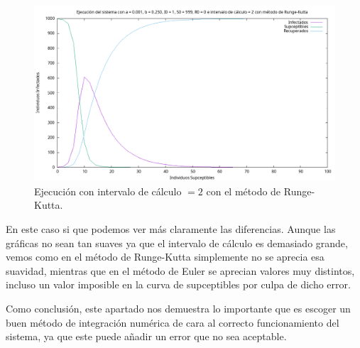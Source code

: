 \documentclass[12pt, spanish]{article}
\begin{document}
\begin{figure}[H]
	\centering
			\includegraphics[width=\textwidth]{SIR_2_runge.png}
			\caption{Ejecución con intervalo de cálculo $= 2$ con el método de Runge-Kutta.}
\end{figure}

En este caso si que podemos ver más claramente las diferencias. Aunque las gráficas no sean tan suaves ya que el intervalo de cálculo es demasiado grande, vemos como en el método de Runge-Kutta simplemente no se aprecia esa suavidad, mientras que en el método de Euler se aprecian valores muy distintos, incluso un valor imposible en la curva de supceptibles por culpa de dicho error.

Como conclusión, este apartado nos demuestra lo importante que es escoger un buen método de integración numérica de cara al correcto funcionamiento del sistema, ya que este puede añadir un error que no sea aceptable.

%
%
\end{document}
